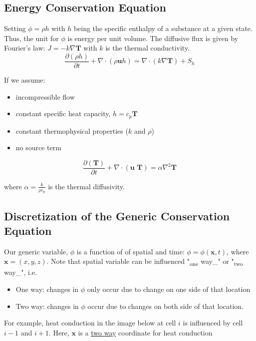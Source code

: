 \documentclass[11pt]{article}
\begin{document}
\subsection{Energy Conservation Equation}
\label{sec:org3dcec94}
Setting \(\phi = \rho h\) with \(h\) being the specific enthalpy of a substance at a given state. Thus, the unit for \(\phi\) is
energy per unit volume. The diffusive flux is given by Fourier's law: \(J = -k \nabla \textbf{T}\) with \(k\) is the thermal conductivity.
\begin{equation}
\frac{\partial (\rho h)}{\partial t} + \nabla \cdot (\rho \textbf{u} h)  = \nabla \cdot (k \nabla \textbf{T}) +
S_h
\end{equation}

If we assume:
\begin{itemize}
\item incompressible flow
\item constant specific heat capacity, \(h = c_p \textbf{T}\)
\item constant thermophysical properties (\(k\) and \(\rho\))
\item no source term
\end{itemize}

\begin{equation}
\frac{\partial (\textbf{T})}{\partial t} + \nabla \cdot (\textbf{u T})  = \alpha \nabla ^2 \textbf{T}
\end{equation}

where \(\alpha = \frac{k}{\rho c_p}\) is the thermal diffusivity. 

\subsection{Discretization of the Generic Conservation Equation}
\label{sec:org17ea291}
Our generic variable, \(\phi\) is a function of of spatial and time: \(\phi = \phi (\textbf{x},t)\), where
\(\textbf{x} = (x,y,z)\). Note that spatial variable can be influenced "\textsubscript{one} way\_" or "\textsubscript{two} way\_", i.e.
\begin{itemize}
\item One way: changes in \(\phi\) only occur due to change on one side of that location
\item Two way: changes in \(\phi\) occur due to changes on both side of that location.
\end{itemize}
For example, heat conduction in the image below at cell \(i\) is influenced by cell \(i-1\) and
\(i+1\). Here, \(\textbf{x}\) is a \uline{two way} coordinate for heat conduction
\end{document}
